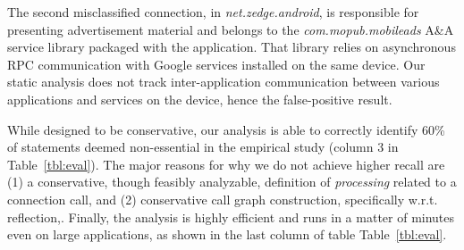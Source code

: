 The second misclassified connection, in \emph{net.zedge.android}, is responsible for presenting advertisement material and belongs to the \emph{com.mopub.mobileads} A\&A service library packaged with the application. 
That library relies on asynchronous RPC communication with Google services 
installed on the same device. Our static analysis does not track inter-application communication between various applications and services on the device, hence the false-positive result.   
 

%

While designed to be conservative, our analysis is able to correctly identify 
60\% of statements deemed non-essential in the empirical study 
(column 3 in Table~\ref{tbl:eval}).  The major reasons for why we do
not achieve higher recall are (1) a conservative, though feasibly
analyzable, definition of {\it processing} related to a connection
call, and (2) conservative call graph construction, specifically
w.r.t. reflection,.  Finally, the analysis is highly efficient and
runs in a matter of minutes even on large applications, as shown in
the last column of table Table~\ref{tbl:eval}.


